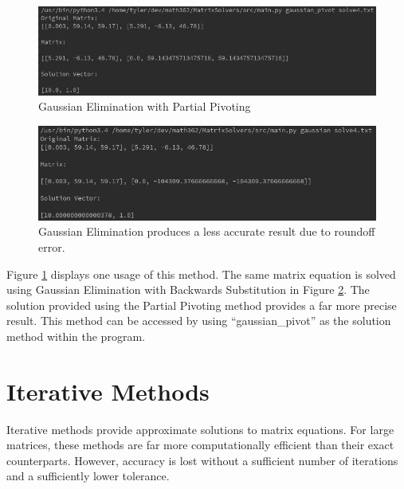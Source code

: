 \documentclass[12pt]{article}
\begin{document}
\begin{figure}[H]
\begin{center}
\includegraphics[scale=.5]{pivot.png}
\caption{Gaussian Elimination with Partial Pivoting}
\label{pivot}
\end{center}
\end{figure}

\begin{figure}[H]
\begin{center}
\includegraphics[scale=.5]{badgaussian.png}
\caption{Gaussian Elimination produces a less accurate result due to roundoff error.}
\label{badgaussian}
\end{center}
\end{figure}

Figure \ref{pivot} displays one usage of this method. The same matrix equation is solved
using Gaussian Elimination with Backwards Substitution in Figure \ref{badgaussian}. 
The solution provided using the Partial Pivoting method provides a far more 
precise result. This method can be accessed by using ``gaussian\_pivot'' as the 
solution method within the program.


\section{Iterative Methods}
Iterative methods provide approximate solutions to matrix equations. For large
matrices, these methods are far more computationally efficient than their
exact counterparts. However, accuracy is lost without a sufficient number of 
iterations and a sufficiently lower tolerance. 
\end{document}
